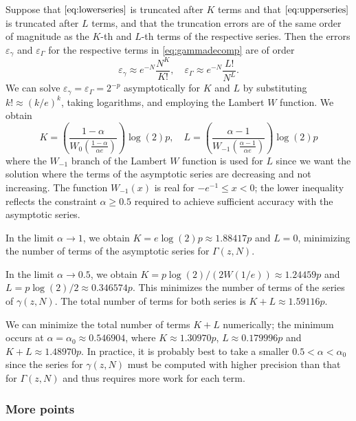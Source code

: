 \documentclass[reqno]{amsart}
\theoremstyle{definition}
\begin{document}
Suppose that $\eqref{eq:lowerseries}$ is truncated after $K$ terms
and that $\eqref{eq:upperseries}$ is truncated after $L$ terms,
and that the truncation errors are of the same order of magnitude
as the $K$-th and $L$-th terms of the respective series.
Then the errors $\varepsilon_{\gamma}$ and $\varepsilon_{\Gamma}$
for the respective terms in \eqref{eq:gammadecomp} are of order
\begin{equation}
\varepsilon_{\gamma} \approx e^{-N} \frac{N^K}{K!}, \quad \varepsilon_{\Gamma} \approx e^{-N} \frac{L!}{N^L}.
\end{equation}
We can solve $\varepsilon_{\gamma} = \varepsilon_{\Gamma} = 2^{-p}$ asymptotically
for $K$ and $L$ by substituting $k! \approx (k/e)^k$,
taking logarithms, and employing
the Lambert $W$ function.
We obtain
\begin{equation}
K = \left(\frac{1-\alpha}{W_0\!\left(\frac{1-\alpha}{\alpha e}\right)} \right) \log(2) p,
\quad L = \left( \frac{\alpha-1}{W_{-1}\!\left(\frac{\alpha-1}{\alpha e}\right)} \right) \log(2) p
\end{equation}
where the $W_{-1}$ branch of the Lambert $W$ function is used for $L$ since we want
the solution where the terms of the asymptotic series are decreasing
and not increasing.
The function $W_{-1}(x)$ is real for $-e^{-1} \le x < 0$;
the lower inequality reflects the constraint $\alpha \ge 0.5$
required to achieve sufficient accuracy with the asymptotic series.

In the limit $\alpha \to 1$, we obtain $K = e \log(2) p \approx 1.88417 p$ and $L = 0$, minimizing
the number of terms of the asymptotic series for $\Gamma(z,N)$.

In the limit $\alpha \to 0.5$, we obtain $K = p \log(2) / (2 W(1/e)) \approx 1.24459 p$
and $L = p \log(2) / 2 \approx 0.346574 p$.
This minimizes the number of terms of the series of $\gamma(z,N)$.
The total number of terms for both series is $K + L \approx 1.59116 p$.

We can minimize the total number of terms $K + L$ numerically;
the minimum occurs at $\alpha = \alpha_0 \approx 0.546904$,
where $K \approx 1.30970p$, $L \approx 0.179996p$ and $K + L \approx 1.48970p$.
In practice, it is probably best to take a smaller $0.5 < \alpha < \alpha_{0}$
since the series for $\gamma(z,N)$ must be computed with higher precision
than that for $\Gamma(z,N)$ and thus requires more work for each term.

\subsubsection{More points}
\end{document}
